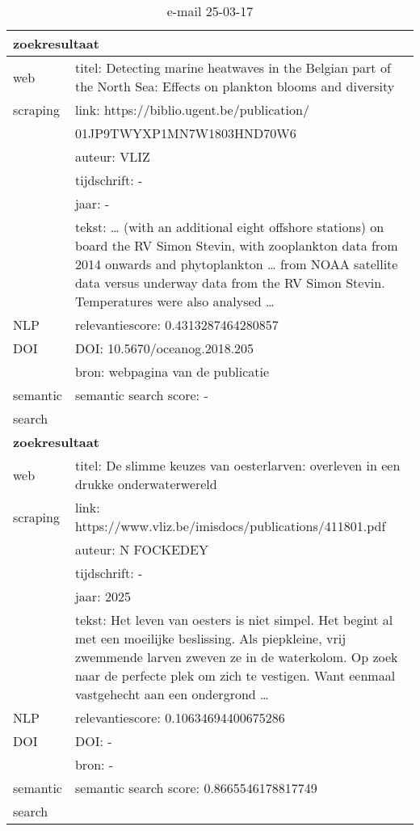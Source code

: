 \begin{table}[h!]
    \caption{e-mail 25-03-17}
    \centering
    \begin{tabularx}{\textwidth}{|p{4cm}|X|} 
        \hline
        \multicolumn{2}{|X|}{\textbf{zoekresultaat}} \\
        \hline
        web &titel: Detecting marine heatwaves in the Belgian part of the North Sea: Effects on plankton blooms and diversity\\
        scraping&link: https://biblio.ugent.be/publication/\\&01JP9TWYXP1MN7W1803HND70W6\\
        &auteur: VLIZ\\
        &tijdschrift: -\\
        &jaar: -\\
        &tekst: … (with an additional eight offshore stations) on board the RV Simon Stevin, with zooplankton data from 2014 onwards and phytoplankton … from NOAA satellite data versus underway data from the RV Simon Stevin. Temperatures were also analysed …\\
        \hline
        NLP&relevantiescore: 0.4313287464280857\\
        \hline
        DOI&DOI: 10.5670/oceanog.2018.205\\
        &bron: webpagina van de publicatie\\
        \hline
        semantic&semantic search score: -\\
        search&\\
        \hline
        \multicolumn{2}{|X|}{\textbf{zoekresultaat}} \\
        \hline
        web &titel: De slimme keuzes van oesterlarven: overleven in een drukke onderwaterwereld\\
        scraping&link: https://www.vliz.be/imisdocs/publications/411801.pdf\\
        &auteur: N FOCKEDEY\\
        &tijdschrift: -\\
        &jaar: 2025\\
        &tekst: Het leven van oesters is niet simpel. Het begint al met een moeilijke beslissing. Als piepkleine, vrij zwemmende larven zweven ze in de waterkolom. Op zoek naar de perfecte plek om zich te vestigen. Want eenmaal vastgehecht aan een ondergrond …\\
        \hline
        NLP&relevantiescore: 0.10634694400675286\\
        \hline
        DOI&DOI: -\\
        &bron: -\\
        \hline
        semantic&semantic search score: 0.8665546178817749\\
        search&\\
        \hline
    \end{tabularx}
    \label{table:email20250317}
\end{table}
